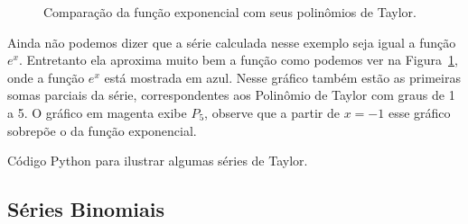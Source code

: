 \begin{figure}
  \begin{center}%
    \vspace{-0.2\baselineskip}%
    \scalebox{0.9}{}%
    \vspace{-\baselineskip}%
  \end{center}
  \caption{Comparação da função exponencial com seus polinômios de Taylor.}
  \label{fig:funcao_tayplor_exponencial}
\end{figure}

Ainda não podemos dizer que a série calculada nesse exemplo seja igual a função~$e^x$.
Entretanto ela aproxima muito bem a função como podemos ver na
Figura~\ref{fig:funcao_tayplor_exponencial},
onde a função $e^x$ está mostrada em azul. Nesse gráfico também estão as primeiras
somas parciais da série, correspondentes aos Polinômio de Taylor com graus de 1 a 5.
O gráfico em magenta exibe $P_5$, observe que a partir de $x=-1$ esse gráfico
sobrepõe o da função exponencial.

{
  Código Python para ilustrar algumas séries de Taylor.
}

\subsection*{Séries Binomiais}

